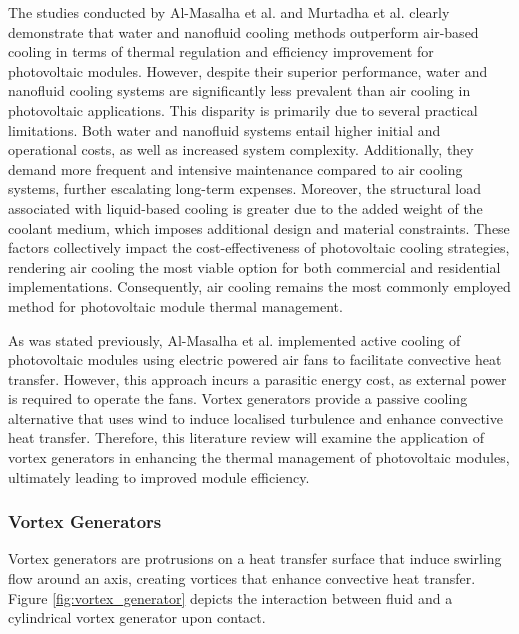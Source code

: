 The studies conducted by Al-Masalha et al. \cite{Al-Masalha2024ImprovingSystems} and Murtadha et al. \cite{Murtadha2022ImprovingNanofluid} clearly demonstrate that water and nanofluid cooling methods outperform air-based cooling in terms of thermal regulation and efficiency improvement for photovoltaic modules. However, despite their superior performance, water and nanofluid cooling systems are significantly less prevalent than air cooling in photovoltaic applications. This disparity is primarily due to several practical limitations. Both water and nanofluid systems entail higher initial and operational costs, as well as increased system complexity. \cite{Dwivedi2020AdvancedArt, Suresh2018RoleEfficiency} Additionally, they demand more frequent and intensive maintenance compared to air cooling systems, further escalating long-term expenses. \cite{Samykano2023HybridApplications, Ponticorvo2022FoulingFluid} Moreover, the structural load associated with liquid-based cooling is greater due to the added weight of the coolant medium, which imposes additional design and material constraints. \cite{Sakanova2016InvestigationAircraft} These factors collectively impact the cost-effectiveness of photovoltaic cooling strategies, rendering air cooling the most viable option for both commercial and residential implementations. Consequently, air cooling remains the most commonly employed method for photovoltaic module thermal management. \cite{Dwivedi2020AdvancedArt} \vspace{0.5em}

As was stated previously, Al-Masalha et al. implemented active cooling of photovoltaic modules using electric powered air fans to facilitate convective heat transfer. \cite{Al-Masalha2024ImprovingSystems} However, this approach incurs a parasitic energy cost, as external power is required to operate the fans. Vortex generators provide a passive cooling alternative that uses wind to induce localised turbulence and enhance convective heat transfer. Therefore, this literature review will examine the application of vortex generators in enhancing the thermal management of photovoltaic modules, ultimately leading to improved module efficiency.

\subsubsection{Vortex Generators}
Vortex generators are protrusions on a heat transfer surface that induce swirling flow around an axis, creating vortices that enhance convective heat transfer. \cite{Awais2018HeatActivities} Figure \ref{fig:vortex_generator} depicts the interaction between fluid and a cylindrical vortex generator upon contact.

